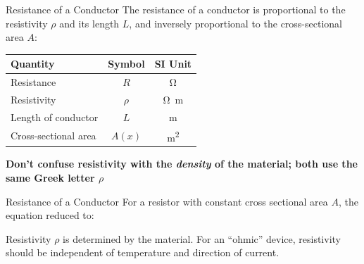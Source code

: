 \documentclass[12pt,aspectratio=169]{beamer}
\begin{document}
\begin{frame}{Resistance of a Conductor}
  The resistance of a conductor is proportional to the resistivity $\rho$ and
  its length $L$, and inversely proportional to the cross-sectional area $A$:

  \begin{center}
    \begin{tabular}{l|c|c}
      \rowcolor{pink}
      \textbf{Quantity} & \textbf{Symbol} & \textbf{SI Unit} \\ \hline
      Resistance           & $R$    & \si\ohm \\
      Resistivity          & $\rho$ & \si{\ohm\metre} \\
      Length of conductor  & $L$    & \si\metre \\
      Cross-sectional area & $A(x)$ & \si{\metre\squared}
    \end{tabular}
  \end{center}
  \textbf{Don't confuse resistivity with the \emph{density} of the material;
    both use the same Greek letter $\rho$}
\end{frame}


\begin{frame}{Resistance of a Conductor}
  For a resistor with constant cross sectional area $A$, the equation reduced
  to:


  Resistivity $\rho$ is determined by the material.
  For an ``ohmic'' device, resistivity should be independent of
  temperature and direction of current.
\end{frame}
\end{document}
